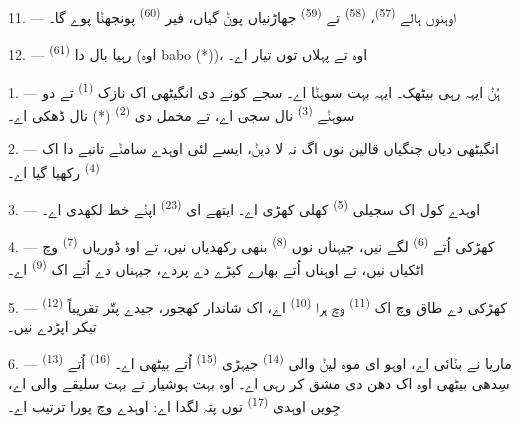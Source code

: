 

11. --- اوہنوں ہالے  \textsuperscript{(57)}،
 \textsuperscript{(58)} تے 
\textsuperscript{(59)} جھاڑنیاں پوݨ گیاں، فیر  \textsuperscript{(60)}
پونجھݨا پوے گا۔

12. --- رہیا بال دا  \textsuperscript{(61)} (اوہ babo (*))، اوہ تے
پہلاں توں تیار اے۔

\VUsaut{5.0mm}
\VUsaut{3.0mm}

1. --- ہُݨ ایہہ رہی بیٹھک۔ ایہہ بہت سوہݨا  اے۔ سجے کونے دی انگیٹھی
اک نازک  \textsuperscript{(1)} تے دو سوہݨے 
\textsuperscript{(3)} نال سجی اے، تے مخمل دی  \textsuperscript{(2)} (*)
نال ڈھکی اے۔

2. --- انگیٹھی دیاں چنگیاں قالین نوں اگ نہ لا دیݨ، ایسے لئی اوہدے سامݨے تانبے دا
اک  \textsuperscript{(4)} رکھیا گیا اے۔

3. --- اوہدے کول اک سجیلی  \textsuperscript{(5)} کھلی کھڑی اے۔
ایتھے ای  \textsuperscript{(23)} اپݨے خط لکھدی اے۔

4. --- کھڑکی اُتے  \textsuperscript{(6)} لگے نیں، جیہناں نوں
 \textsuperscript{(8)} بنھی رکھدیاں نیں، تے اوہ ڈوریاں
 \textsuperscript{(7)} وچ اٹکیاں نیں، تے اوہناں اُتے بھارے کپڑے دے
پردے، جیہناں دے اُتے اک  \textsuperscript{(9)} اے۔

5. --- کھڑکی دے طاق وچ اک  \textsuperscript{(11)} وچ ہرا
 \textsuperscript{(10)} اے، اک شاندار کھجور، جیدے پتّر تقریباً
 \textsuperscript{(12)} تیکر اپڑدے نیں۔

6. ---  \textsuperscript{(13)} ماریا نے بݨائی اے، اوہو ای موہ
لیݨ والی  \textsuperscript{(14)} جیہڑی 
\textsuperscript{(15)} اُتے بیٹھی اے۔  \textsuperscript{(16)} اُتے سِدھی
بیٹھی اوہ اک دھن دی مشق کر رہی اے۔ اوہ بہت ہوشیار تے بہت سلیقے والی اے، جِویں
اوہدی  \textsuperscript{(17)} توں پتہ لگدا اے: اوہدے وچ
پورا ترتیب اے۔

